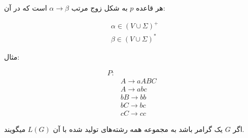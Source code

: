 هر قاعده 
$p$
به شکل زوج مرتب
$\alpha \rightarrow \beta$
است که در آن:

\begin{align*}
    &\alpha \in (V \cup \Sigma)^+\\
    &\beta \in (V \cup \Sigma)^*
\end{align*}

\begin{example}
    مثال:

    \begin{align*}
        P:&\\
        &A \rightarrow aABC\\
        &A \rightarrow abc\\
        &bB \rightarrow bb\\
        &bC \rightarrow bc\\
        &cC \rightarrow cc
    \end{align*}
\end{example}

اگر 
$G$
یک گرامر باشد به مجموعه همه رشته‌های تولید شده با آن
$L(G)$
میگویند.